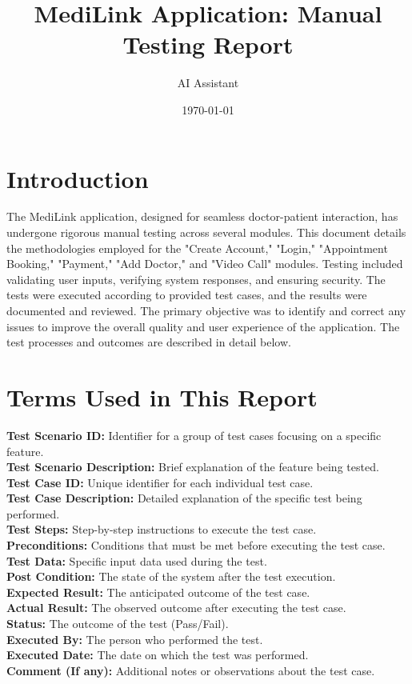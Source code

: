 \documentclass{article}
\title{MediLink Application: Manual Testing Report}
\author{AI Assistant}
\date{\today}
\begin{document}
\maketitle

\section{Introduction}

The MediLink application, designed for seamless doctor-patient interaction, has undergone rigorous manual testing across several modules. This document details the methodologies employed for the "Create Account," "Login," "Appointment Booking," "Payment," "Add Doctor," and "Video Call" modules. Testing included validating user inputs, verifying system responses, and ensuring security. The tests were executed according to provided test cases, and the results were documented and reviewed. The primary objective was to identify and correct any issues to improve the overall quality and user experience of the application. The test processes and outcomes are described in detail below.

\section{Terms Used in This Report}
\noindent
\textbf{Test Scenario ID:} Identifier for a group of test cases focusing on a specific feature. \\
\textbf{Test Scenario Description:} Brief explanation of the feature being tested. \\
\textbf{Test Case ID:} Unique identifier for each individual test case. \\
\textbf{Test Case Description:} Detailed explanation of the specific test being performed. \\
\textbf{Test Steps:} Step-by-step instructions to execute the test case. \\
\textbf{Preconditions:} Conditions that must be met before executing the test case. \\
\textbf{Test Data:} Specific input data used during the test. \\
\textbf{Post Condition:} The state of the system after the test execution. \\
\textbf{Expected Result:} The anticipated outcome of the test case. \\
\textbf{Actual Result:} The observed outcome after executing the test case. \\
\textbf{Status:} The outcome of the test (Pass/Fail). \\
\textbf{Executed By:} The person who performed the test. \\
\textbf{Executed Date:} The date on which the test was performed. \\
\textbf{Comment (If any):} Additional notes or observations about the test case. \\
\end{document}
